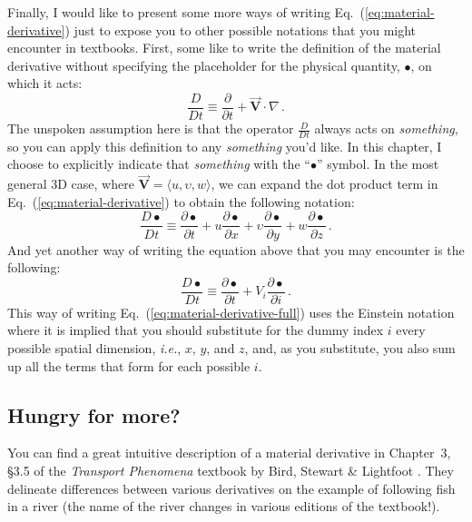 Finally, I would like to present some more ways of writing Eq.~(\ref{eq:material-derivative}) just to expose you to other possible notations that you might encounter in textbooks. 
First, some like to write the definition of the material derivative without specifying the placeholder for the physical quantity, $\bullet$, on which it acts:
\begin{equation} \label{eq:material-derivative-no-placeholder}
\frac{D }{D t} \equiv \frac{\partial}{\partial t} + \vec{\bm{V}} \cdot \nabla \, .
\end{equation}
The unspoken assumption here is that the operator $\frac{D }{D t}$ always acts on \textit{something}, so you can apply this definition to any \textit{something} you'd like. In this chapter, I choose to explicitly indicate that \textit{something} with the ``$\bullet$'' symbol.
In the most general 3D case, where $\vec{\bm{V}} = \langle u, \upsilon, w \rangle$, we can expand the dot product term in Eq.~(\ref{eq:material-derivative}) to obtain the following notation:
\begin{equation} \label{eq:material-derivative-full}
\frac{D \bullet}{D t} \equiv \frac{\partial \bullet}{\partial t} + u \frac{\partial \bullet}{\partial x} + \upsilon \frac{\partial \bullet}{\partial y} + w \frac{\partial \bullet}{\partial z} \, .
\end{equation}
And yet another way of writing the equation above that you may encounter is the following:
\begin{equation} \label{eq:material-derivative-ein stein}
\frac{D \bullet}{D t} \equiv \frac{\partial \bullet}{\partial t} + V_i \frac{\partial \bullet}{\partial i} \, .
\end{equation}
This way of writing Eq.~(\ref{eq:material-derivative-full}) uses the Einstein notation where it is implied that you should substitute for the dummy index $i$ every possible spatial dimension, \textit{i.e.}, $x$, $y$, and $z$, and, as you substitute, you also sum up all the terms that form for each possible $i$.

\vfill

\newpage


\begin{mdframed}[style=exercise-frame]

\subsection*{Hungry for more?}

You can find a great intuitive description of a material derivative in Chapter~3, \S3.5 of the \textit{Transport Phenomena} textbook by Bird, Stewart \& Lightfoot \cite{bird2002transport}. They delineate differences between various derivatives on the example of following fish in a river (the name of the river changes in various editions of the textbook!).

\end{mdframed}

